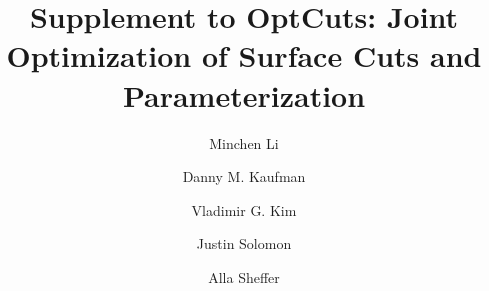 \documentclass[acmtog]{acmart}
\begin{document}
\title{Supplement to OptCuts: Joint Optimization of Surface Cuts and Parameterization
} 

\author{Minchen Li}

\author{Danny M. Kaufman}

\author{Vladimir G. Kim} 

\author{Justin Solomon}

\author{Alla Sheffer}

\renewcommand\shortauthors{Li, M. et al}
\end{document}
